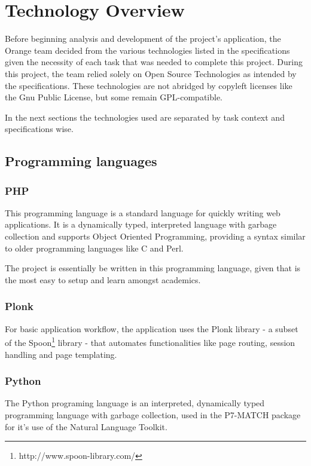 \section{Technology Overview}

Before beginning analysis and development of the project's application, the
Orange team decided from the various technologies  listed in the specifications
given the necessity of each task that was needed to complete this project.
During this project, the team relied solely on Open Source Technologies as
intended by the specifications. These technologies are not abridged by copyleft
licenses like the Gnu Public License, but some remain GPL-compatible.

In the next sections the technologies used are separated by task context and 
specifications wise.

\subsection{Programming languages}

\subsubsection{PHP}

This programming language is a standard language for quickly writing web
applications.  It is a dynamically typed, interpreted language with garbage
collection and supports Object Oriented Programming, providing a syntax similar
to older programming languages like C and Perl.

The project is essentially be written in this programming language, given that
is the most easy to setup and learn amongst academics.

\subsubsection{Plonk}

For basic application workflow, the application uses the Plonk library - a
subset of the Spoon\footnote{http://www.spoon-library.com/} library - that
automates functionalities like page routing, session handling and page
templating.

\subsubsection{Python}

The Python programing language is an interpreted, dynamically typed programming
language with garbage collection, used in the P7-MATCH package for it's use of
the Natural Language Toolkit.

